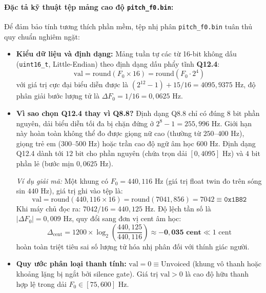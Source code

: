 \documentclass[11pt,a4paper]{article}
\begin{document}
\paragraph{Đặc tả kỹ thuật tệp mảng cao độ \texttt{pitch\_f0.bin}:}
Để đảm bảo tính tương thích phần mềm, tệp nhị phân \texttt{pitch\_f0.bin} tuân thủ quy chuẩn nghiêm ngặt:
\begin{itemize}
    \setlength{\itemsep}{0.5pt}
    \item \textbf{Kiểu dữ liệu và định dạng:} Mảng tuần tự các từ 16-bit không dấu (\texttt{uint16\_t}, Little-Endian) theo định dạng dấu phẩy tĩnh \textbf{Q12.4}:
    \begin{equation}
    \text{val} = \text{round}(F_0 \times 16) = \text{round}(F_0 \cdot 2^4)
    \label{eq:q12_4_def}
    \end{equation}
    với giá trị cực đại biểu diễn được là $(2^{12} - 1) + 15/16 = 4095{,}9375\text{ Hz}$, độ phân giải bước lượng tử là $\Delta F_0 = 1/16 = 0{,}0625\text{ Hz}$.
    \item \textbf{Vì sao chọn Q12.4 thay vì Q8.8?} Định dạng Q8.8 chỉ có đúng $8\text{ bit}$ phần nguyên, dải biểu diễn tối đa bị chặn đứng ở $2^8 - 1 = 255{,}996\text{ Hz}$. Giới hạn này hoàn toàn không thể đo được giọng nữ cao (thường từ $250\text{--}400\text{ Hz}$), giọng trẻ em ($300\text{--}500\text{ Hz}$) hoặc trần cao độ ngữ âm học $600\text{ Hz}$. Định dạng Q12.4 dành tới $12\text{ bit}$ cho phần nguyên (chứa trọn dải $[0, 4095]\text{ Hz}$) và $4\text{ bit}$ phần lẻ (bước mịn $0{,}0625\text{ Hz}$).
    
    \textit{Ví dụ giải mã:} Một khung có $F_0 = 440{,}116\text{ Hz}$ (giá trị float twin đo trên sóng sin $440\text{ Hz}$), giá trị ghi vào tệp là:
    \[
    \text{val} = \text{round}(440{,}116 \times 16) = \text{round}(7041{,}856) = 7042 \equiv \texttt{0x1B82}
    \]
    Khi máy chủ đọc ra: $7042 / 16 = 440{,}125\text{ Hz}$. Độ lệch tần số là $|\Delta F_0| = 0{,}009\text{ Hz}$, quy đổi sang đơn vị cent âm học:
    \[
    \Delta_{\text{cent}} = 1200 \times \log_2\left(\frac{440{,}125}{440{,}116}\right) \approx \mathbf{-0{,}035\text{ cent}} \ll 1\text{ cent}
    \]
    hoàn toàn triệt tiêu sai số lượng tử hóa nhị phân đối với thính giác người.
    \item \textbf{Quy ước phân loại thanh tính:} $\text{val} = 0 \equiv \text{Unvoiced}$ (khung vô thanh hoặc khoảng lặng bị ngắt bởi silence gate). Giá trị $\text{val} > 0$ là cao độ hữu thanh hợp lệ trong dải $F_0 \in [75, 600]\text{ Hz}$.
\end{itemize}
\end{document}
